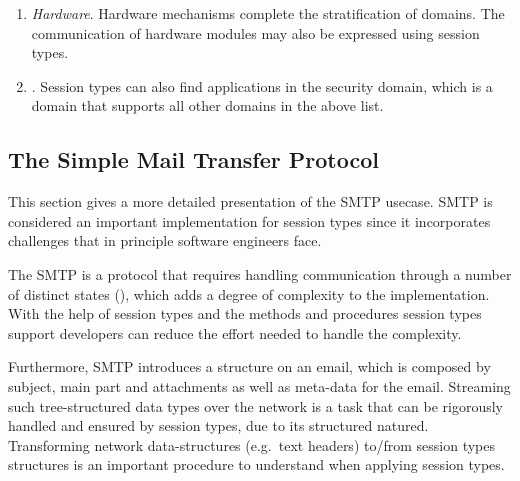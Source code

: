 \begin{enumerate}


	\item	{\em Hardware}.
	Hardware mechanisms complete the stratification of domains.
	The communication of hardware modules may also be expressed
	using session types.


	\item	{}.
	Session types can also find applications in the security domain,
	which is a domain that supports all other domains in the above list.

\end{enumerate}



\subsection{The Simple Mail Transfer Protocol}

This section gives a more detailed presentation of the SMTP
usecase. SMTP is considered an important implementation for
session types since it incorporates challenges that in principle
software engineers face.

The SMTP is a protocol that requires handling
communication through a number of distinct states (),
which adds a degree of complexity to the implementation.
With the help of session types and the methods and procedures
session types support developers can reduce the effort
needed to handle the complexity.

Furthermore, SMTP introduces a structure on an email,
which is composed by subject, main part and attachments
as well as meta-data for the email. Streaming such 
tree-structured data types over the network is a task that
can be rigorously handled and ensured by session types,
due to its structured natured. Transforming
network data-structures (e.g.~text headers)
to/from session types structures is an important
procedure to understand when applying session types. 

